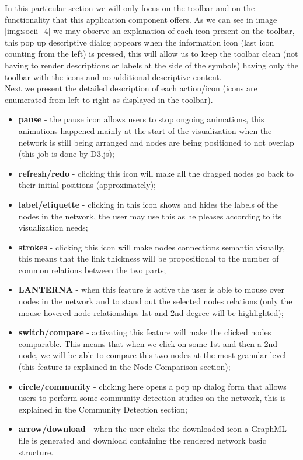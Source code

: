 In this particular section we will only focus on the toolbar and on the functionality that this application component offers. As we can see in image \ref{img:socii_4} we may observe an explanation of each icon present on the toolbar, this pop up descriptive dialog appears when the information icon (last icon counting from the left) is pressed, this will allow us to keep the toolbar clean (not having to render descriptions or labels at the side of the symbols) having only the toolbar with the icons and no additional descriptive content.\\
\indent Next we present the detailed description of each action/icon (icons are enumerated from left to right as displayed in the toolbar).
\begin{itemize}
    \item \textbf{pause} - the pause icon allows users to stop ongoing animations, this animations happened mainly at the start of the visualization when the network is still being arranged and nodes are being positioned to not overlap (this job is done by D3.js);
    \item \textbf{refresh/redo} - clicking this icon will make all the dragged nodes go back to their initial positions (approximately);
    \item \textbf{label/etiquette} - clicking in this icon shows and hides the labels of the nodes in the network, the user may use this as he pleases according to its visualization needs;
    \item \textbf{strokes} - clicking this icon will make nodes connections semantic visually, this means that the link thickness will be propositional to the number of common relations between the two parts;
    \item \textbf{LANTERNA} - when this feature is active the user is able to mouse over nodes in the network and to stand out the selected nodes relations (only the mouse hovered node relationships 1st and 2nd degree will be highlighted);
    \item \textbf{switch/compare} - activating this feature will make the clicked nodes comparable. This means that when we click on some 1st and then a 2nd node, we will be able to compare this two nodes at the most granular level (this feature is explained in the Node Comparison section);
    \item \textbf{circle/community} - clicking here opens a pop up dialog form that allows users to perform some community detection studies on the network, this is explained in the Community Detection section;
    \item \textbf{arrow/download} - when the user clicks the downloaded icon a GraphML file is generated and download containing the rendered network basic structure.
\end{itemize}

